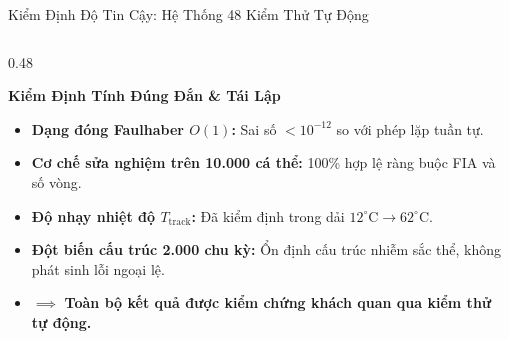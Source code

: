 \documentclass[aspectratio=169, 10pt]{beamer}
\begin{document}
\begin{frame}{Kiểm Định Độ Tin Cậy: Hệ Thống 48 Kiểm Thử Tự Động}
  \begin{columns}[T]
    \begin{column}{0.48\textwidth}
      \vspace{0.15cm}

      \begin{block}{\textbf{Kiểm Định Tính Đúng Đắn \& Tái Lập}}
        \scriptsize
        \begin{itemize}
          \item \textbf{Dạng đóng Faulhaber $O(1)$:} Sai số $< 10^{-12}$ so với phép lặp tuần tự.
          \item \textbf{Cơ chế sửa nghiệm trên 10.000 cá thể:} 100\% hợp lệ ràng buộc FIA và số vòng.
          \item \textbf{Độ nhạy nhiệt độ $T_{\text{track}}$:} Đã kiểm định trong dải $12^\circ\text{C} \to 62^\circ\text{C}$.
          \item \textbf{Đột biến cấu trúc 2.000 chu kỳ:} Ổn định cấu trúc nhiễm sắc thể, không phát sinh lỗi ngoại lệ.
          \item $\mathbf{\implies}$ \textbf{Toàn bộ kết quả được kiểm chứng khách quan qua kiểm thử tự động.}
        \end{itemize}
      \end{block}
    \end{column}


\end{columns}
\end{frame}
\end{document}
